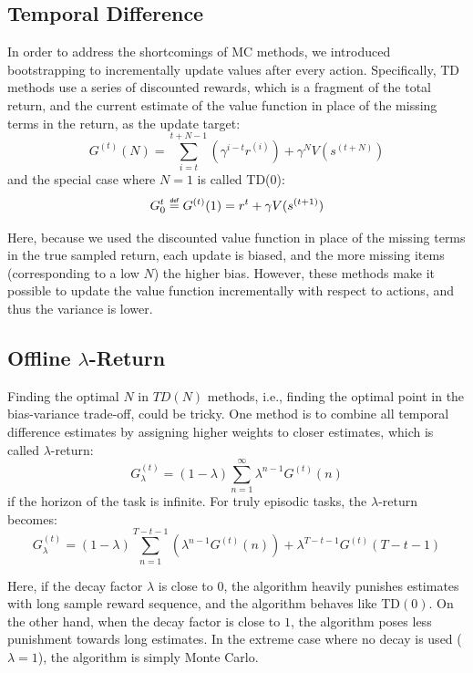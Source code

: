 \documentclass[11pt]{article}
\newcommand\defeq{\mathrel{\overset{\makebox[0pt]{\mbox{\normalfont\tiny\sffamily def}}}{=}}}
\begin{document}
\subsection{Temporal Difference}

In order to address the shortcomings of MC methods, we introduced bootstrapping to incrementally update values after every action. Specifically, TD methods use a series of discounted rewards, which is a fragment of the total return, and the current estimate of the value function in place of the missing terms in the return, as the update target:
\begin{equation}
    G^{(t)}(N) = \sum_{i=t}^{t+N-1}\left(\gamma^{i-t}r^{(i)}\right)+\gamma^NV(s^{(t+N)})
\end{equation}
and the special case where $N=1$ is called TD(0):
\begin{equation}
    G^{t}_0\defeq G^{(t)}(1)= r^{t} + \gamma V(s^{(t+1)})
\end{equation}

Here, because we used the discounted value function in place of the missing terms in the true sampled return, each update is biased, and the more missing items (corresponding to a low $N$) the higher bias. However, these methods make it possible to update the value function incrementally with respect to actions, and thus the variance is lower.

\subsection{Offline $\lambda$-Return}

Finding the optimal $N$ in $TD(N)$ methods, i.e., finding the optimal point in the bias-variance trade-off, could be tricky. One method is to combine all temporal difference estimates by assigning higher weights to closer estimates, which is called $\lambda$-return:
\begin{equation}
    G_{\lambda}^{(t)} = (1-\lambda)\sum_{n=1}^\infty\lambda^{n-1}G^{(t)}(n)
    \label{lambda1}
\end{equation}
if the horizon of the task is infinite. For truly episodic tasks, the $\lambda$-return becomes:
\begin{equation}
    G_{\lambda}^{(t)} = (1-\lambda)\sum_{n=1}^{T-t-1}\left(\lambda^{n-1}G^{(t)}(n)\right) + \lambda^{T-t-1}G^{(t)}(T-t-1)
    \label{lambda2}
\end{equation}

Here, if the decay factor $\lambda$ is close to $0$, the algorithm heavily punishes estimates with long sample reward sequence, and the algorithm behaves like TD$(0)$. On the other hand, when the decay factor is close to $1$, the algorithm poses less punishment towards long estimates. In the extreme case where no decay is used ($\lambda=1$), the algorithm is simply Monte Carlo. 
\end{document}
